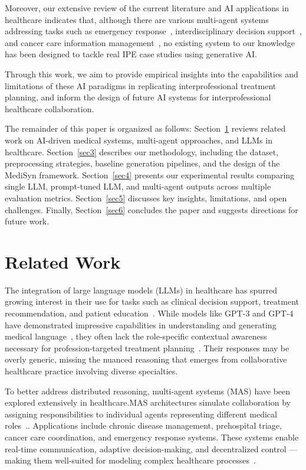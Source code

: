 \documentclass[pdflatex,sn-mathphys-num]{sn-jnl}%
\theoremstyle{thmstyleone}%
\theoremstyle{thmstyletwo}%
\theoremstyle{thmstylethree}%
\begin{document}
Moreover, our extensive review of the current literature and AI applications in healthcare indicates that, although there are various multi-agent systems addressing tasks such as emergency response~\cite{han2024development}, interdisciplinary decision support~\cite{wilk2016semantic}, and cancer care information management~\cite{mohammadzadeh2013multi}, no existing system to our knowledge has been designed to tackle real IPE case studies using generative AI.

Through this work, we aim to provide empirical insights into the capabilities and limitations of these AI paradigms in replicating interprofessional treatment planning, and inform the design of future AI systems for interprofessional healthcare collaboration.

The remainder of this paper is organized as follows: Section~\ref{sec2} reviews related work on AI-driven medical systems, multi-agent approaches, and LLMs in healthcare. Section~\ref{sec3} describes our methodology, including the dataset, preprocessing strategies, baseline generation pipelines, and the design of the MediSyn framework. Section~\ref{sec4} presents our experimental results comparing single LLM, prompt-tuned LLM, and multi-agent outputs across multiple evaluation metrics. Section~\ref{sec5} discusses key insights, limitations, and open challenges. Finally, Section~\ref{sec6} concludes the paper and suggests directions for future work.


\section{Related Work}\label{sec2}

The integration of large language models (LLMs) in healthcare has spurred growing interest in their use for tasks such as clinical decision support, treatment recommendation, and patient education~\cite{singhal2023gpt4med, biswas2023role, patel2023chatgpt, nori2023capabilities}. While models like GPT-3 and GPT-4 have demonstrated impressive capabilities in understanding and generating medical language~\cite{lee2023benefits, li2023can}, they often lack the role-specific contextual awareness necessary for profession-targeted treatment planning~\cite{valmeek2023prompt}. Their responses may be overly generic, missing the nuanced reasoning that emerges from collaborative healthcare practice involving diverse specialties.

To better address distributed reasoning, multi-agent systems (MAS) have been explored extensively in healthcare.MAS architectures simulate collaboration by assigning responsibilities to individual agents representing different medical roles~\cite{ghazal2014multiagent, lemke2011agent, abidi2017ontology}.. Applications include chronic disease management, prehospital triage, cancer care coordination, and emergency response systems. These systems enable real-time communication, adaptive decision-making, and decentralized control — making them well-suited for modeling complex healthcare processes~\cite{lemke2011agent, abidi2017ontology}.
\end{document}
